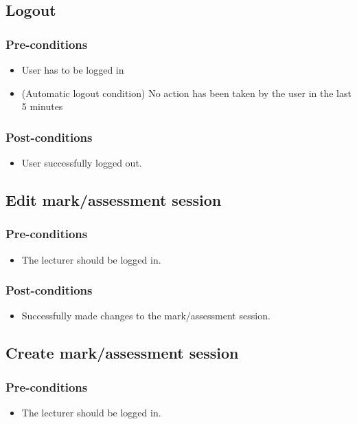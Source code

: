 \subsection{Logout}
\subsubsection{Pre-conditions}
\begin{itemize}
\item User has to be logged in
\item (Automatic logout condition) No action has been taken by the user in the last 5 minutes
\end{itemize}
\subsubsection{Post-conditions}
\begin{itemize}
\item User successfully logged out.
\end{itemize}

\subsection{Edit mark/assessment session}
\subsubsection{Pre-conditions}
\begin{itemize}
\item The lecturer should be logged in.
\end{itemize}
\subsubsection{Post-conditions}
\begin{itemize}
\item Successfully made changes to the  mark/assessment session.
\end{itemize}

\subsection{Create mark/assessment session}
\subsubsection{Pre-conditions}
\begin{itemize}
\item The lecturer should be logged in.
\end{itemize}
